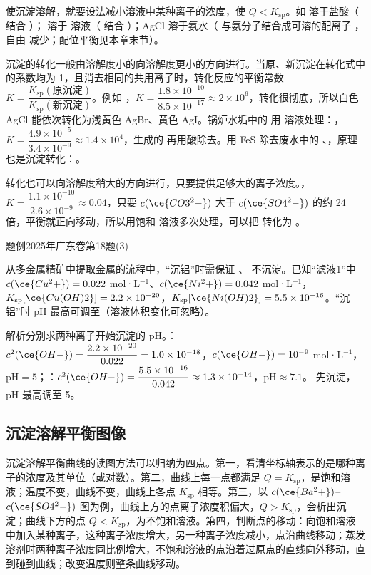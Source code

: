 \documentclass[UTF8,a4paper,zihao=5,oneside,openany,fontset=none]{ctexbook}
\def\heiti{\CJKfamily{zhhei}}
\newenvironment{zhenti}[1]{\par\addvspace{.7em}\Needspace{5\baselineskip}\color{black}\noindent
 {\heiti 题例\quad}{\small #1}\par\nobreak\smallskip\nobreak\ignorespaces}{\par\addvspace{.6em}}
\newcommand{\tk}[1][3em]{\underline{\hspace{#1}}}
\begin{document}
使沉淀溶解，就要设法减小溶液中某种离子的浓度，使 $Q<K_\text{sp}$。如  溶于盐酸（ 结合 ）； 溶于  溶液（ 结合 ）；AgCl 溶于氨水（ 与氨分子结合成可溶的配离子 \ce{[Ag(NH3)2]+}，自由  减少；配位平衡见本章末节）。

沉淀的转化一般由溶解度小的向溶解度更小的方向进行。当原、新沉淀在转化式中的系数均为 1，且消去相同的共用离子时，转化反应的平衡常数 $K=\dfrac{K_\text{sp}(\text{原沉淀})}{K_\text{sp}(\text{新沉淀})}$。例如 ，$K=\dfrac{1.8\times10^{-10}}{8.5\times10^{-17}}\approx2\times10^6$，转化很彻底，所以白色 AgCl 能依次转化为浅黄色 AgBr、黄色 AgI。锅炉水垢中的  用  溶液处理：，$K=\dfrac{4.9\times10^{-5}}{3.4\times10^{-9}}\approx1.4\times10^4$，生成的  再用酸除去。用 FeS 除去废水中的 、，原理也是沉淀转化：。

转化也可以向溶解度稍大的方向进行，只要提供足够大的离子浓度。，$K=\dfrac{1.1\times10^{-10}}{2.6\times10^{-9}}\approx0.04$，只要 $c(\ce{CO3^2-})$ 大于 $c(\ce{SO4^2-})$ 的约 24 倍，平衡就正向移动，所以用饱和  溶液多次处理，可以把  转化为 。

\begin{zhenti}{2025年广东卷第18题(3)}
从多金属精矿中提取金属的流程中，“沉铝”时需保证 、 不沉淀。已知“滤液1”中 $c(\ce{Cu^2+})=0.022$ mol·L$^{-1}$、$c(\ce{Ni^2+})=0.042$ mol·L$^{-1}$，$K_\text{sp}[\ce{Cu(OH)2}]=2.2\times10^{-20}$，$K_\text{sp}[\ce{Ni(OH)2}]=5.5\times10^{-16}$。“沉铝”时 pH 最高可调至\tk（溶液体积变化可忽略）。

{\heiti 解析}\quad 分别求两种离子开始沉淀的 pH。：$c^2(\ce{OH-})=\dfrac{2.2\times10^{-20}}{0.022}=1.0\times10^{-18}$，$c(\ce{OH-})=10^{-9}$ mol·L$^{-1}$，pH$=5$；：$c^2(\ce{OH-})=\dfrac{5.5\times10^{-16}}{0.042}\approx1.3\times10^{-14}$，pH$\approx7.1$。 先沉淀，pH 最高调至 5。
\end{zhenti}

\subsection{沉淀溶解平衡图像}
沉淀溶解平衡曲线的读图方法可以归纳为四点。第一，看清坐标轴表示的是哪种离子的浓度及其单位（或对数）。第二，曲线上每一点都满足 $Q=K_\text{sp}$，是饱和溶液；温度不变，曲线不变，曲线上各点 $K_\text{sp}$ 相等。第三，以 $c(\ce{Ba^2+})$–$c(\ce{SO4^2-})$ 图为例，曲线上方的点离子浓度积偏大，$Q>K_\text{sp}$，会析出沉淀；曲线下方的点 $Q<K_\text{sp}$，为不饱和溶液。第四，判断点的移动：向饱和溶液中加入某种离子，这种离子浓度增大，另一种离子浓度减小，点沿曲线移动；蒸发溶剂时两种离子浓度同比例增大，不饱和溶液的点沿着过原点的直线向外移动，直到碰到曲线；改变温度则整条曲线移动。
\end{document}
